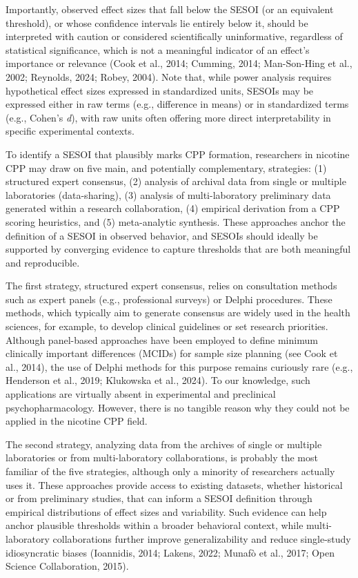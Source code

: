 \documentclass[authordate, meta]{jote-new-article}
\begin{document}
	Importantly, observed effect sizes that fall below the SESOI (or an equivalent threshold), or whose confidence intervals lie entirely below it, should be interpreted with caution or considered scientifically uninformative, regardless of statistical significance, which is not a meaningful indicator of an effect's importance or relevance (Cook et al., 2014; Cumming, 2014; Man-Son-Hing et al., 2002; Reynolds, 2024; Robey, 2004). Note that, while power analysis requires hypothetical effect sizes expressed in standardized units, SESOIs may be expressed either in raw terms (e.g., difference in means) or in standardized terms (e.g., Cohen's \emph{d}), with raw units often offering more direct interpretability in specific experimental contexts.



	To identify a SESOI that plausibly marks CPP formation, researchers in nicotine CPP may draw on five main, and potentially complementary, strategies: (1) structured expert consensus, (2) analysis of archival data from single or multiple laboratories (data-sharing), (3) analysis of multi-laboratory preliminary data generated within a research collaboration, (4) empirical derivation from a CPP scoring heuristics, and (5) meta-analytic synthesis. These approaches anchor the definition of a SESOI in observed behavior, and SESOIs should ideally be supported by converging evidence to capture thresholds that are both meaningful and reproducible.



	The first strategy, structured expert consensus, relies on consultation methods such as expert panels (e.g., professional surveys) or Delphi procedures. These methods, which typically aim to generate consensus are widely used in the health sciences, for example, to develop clinical guidelines or set research priorities. Although panel-based approaches have been employed to define minimum clinically important differences (MCIDs) for sample size planning (see Cook et al., 2014), the use of Delphi methods for this purpose remains curiously rare (e.g., Henderson et al., 2019; Klukowska et al., 2024). To our knowledge, such applications are virtually absent in experimental and preclinical psychopharmacology. However, there is no tangible reason why they could not be applied in the nicotine CPP field.



	The second strategy, analyzing data from the archives of single or multiple laboratories or from multi-laboratory collaborations, is probably the most familiar of the five strategies, although only a minority of researchers actually uses it. These approaches provide access to existing datasets, whether historical or from preliminary studies, that can inform a SESOI definition through empirical distributions of effect sizes and variability. Such evidence can help anchor plausible thresholds within a broader behavioral context, while multi-laboratory collaborations further improve generalizability and reduce single-study idiosyncratic biases (Ioannidis, 2014; Lakens, 2022; Munafò et al., 2017; Open Science Collaboration, 2015).
\end{document}
